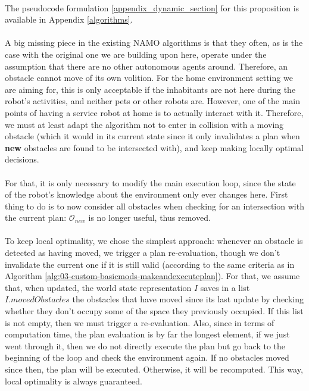 \paragraph{} The pseudocode formulation \ref{appendix_dynamic_section} for this proposition is available in Appendix \ref{algorithms}.

\paragraph{} A big missing piece in the existing NAMO algorithms is that they often, as is the case with the original one we are building upon here, operate under the assumption that there are no other autonomous agents around. Therefore, an obstacle cannot move of its own volition. For the home environment setting we are aiming for, this is only acceptable if the inhabitants are not here during the robot's activities, and neither pets or other robots are. However, one of the main points of having a service robot at home is to actually interact with it. Therefore, we must at least adapt the algorithm not to enter in collision with a moving obstacle (which it would in its current state since it only invalidates a plan when \textbf{new} obstacles are found to be intersected with), and keep making locally optimal decisions.

\paragraph{} For that, it is only necessary to modify the main execution loop, since the state of the robot's knowledge about the environment only ever changes here. First thing to do is to now consider all obstacles when checking for an intersection with the current plan: $\mathcal{O}_{new}$ is no longer useful, thus removed.

\paragraph{} To keep local optimality, we chose the simplest approach: whenever an obstacle is detected as having moved, we trigger a plan re-evaluation, though we don't invalidate the current one if it is still valid (according to the same criteria as in Algorithm  \ref{alg:03-custom-basicmods-makeandexecuteplan}). For that, we assume that, when updated, the world state representation $I$ saves in a list $I.movedObstacles$ the obstacles that have moved since its last update by checking whether they don't occupy some of the space they previously occupied. If this list is not empty, then we must trigger a re-evaluation. Also, since in terms of computation time, the plan evaluation is by far the longest element, if we just went through it, then we do not directly execute the plan but go back to the beginning of the loop and check the environment again. If no obstacles moved since then, the plan will be executed. Otherwise, it will be recomputed. This way, local optimality is always guaranteed.

